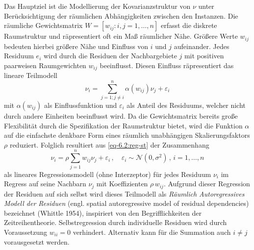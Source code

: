 Das Hauptziel ist die Modellierung der Kovarianzstruktur von $\nu$ unter Berücksichtigung der 
räumlichen Abhängigkeiten zwischen den Instanzen.
Die räumliche Gewichtsmatrix $W=[w_{ij}:i,j=1,\ldots,n]$ 
erfasst die diskrete Raumstruktur und räpresentiert oft ein Maß räumlicher Nähe. Größere Werte $w_{ij}$ 
bedeuten hierbei größere Nähe und Einfluss von $i$ und $j$ aufeinander. Jedes Residuum $e_{i}$ wird 
durch die Residuen der Nachbargebiete $j$ mit positiven paarweisen Raumgewichten $w_{ij}$ beeinflusst. 
Diesen Einfluss räpresentiert das lineare Teilmodell
\begin{equation} \label{eq-6.2:reg-st}
    \nu_{i}=\sum_{j=1 ; j \neq i}^{n} \alpha(w_{ij}) \nu_{j} + \varepsilon_{i}
\end{equation}   
mit $\alpha(w_{ij})$ als Einflussfunktion und $\varepsilon_{i}$ als Anteil des Residuums, welcher 
nicht durch andere Einheiten beeinflusst wird. Da die Gewichtsmatrix bereits große Flexibilität durch 
die Spezifikation der Raumstruktur bietet, wird die Funktion $\alpha$ auf die einfachste 
denkbare Form eines räumlich unabhängigen Skalierungsfaktors $\rho$ reduziert.
Folglich resultiert aus \eqref{eq-6.2:reg-st} der Zusammenhang
\begin{equation}\label{eq-6.3:reg-err}
    \nu_{i}=\rho \sum_{j = 1}^{n} w_{ij} \nu_{j} + \varepsilon_{i} \, , \quad 
    \varepsilon_{i} \sim \mathcal{N}(0,\sigma^{2}) \, , \, i= 1,\ldots,n
\end{equation}
als lineares Regressionsmodell (ohne Interzeptor) für jedes Residuum $\nu_{i}$ im Regress auf 
seine Nachbarn $\nu_{j}$ mit Koeffizienten $\rho \, w_{ij}$. Aufgrund dieser Regression der 
Residuen auf \glqq sich selbst \grqq{} wird dieses Teilmodell 
als \emph{Räumlich Autoregressives Modell der Residuen} 
(engl. spatial autoregressive model of residual dependencies) 
bezeichnet (Whittle 1954), inspiriert von den Begrifflichkeiten der Zeitreihentheorie. 
Selbstregression durch individuelle Residuen wird durch Voraussetzung $w_{ii}=0$ verhindert. Alternativ kann für die 
Summation auch $i \neq j$ vorausgesetzt werden.

